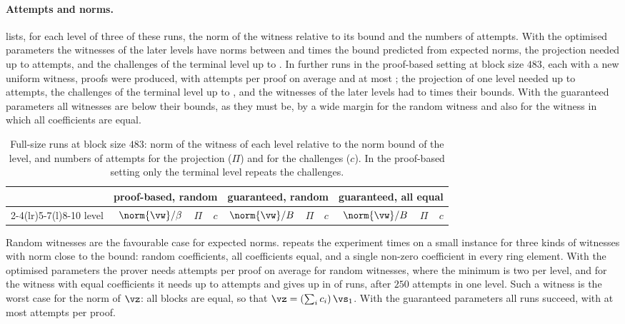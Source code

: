 \paragraph{Attempts and norms.}
 lists, for each level of three of these runs, the norm of the witness relative to its bound and the numbers of attempts. With the optimised parameters the witnesses of the later levels have norms between \nFillLo{} and \nFillHi{} times the bound predicted from expected norms, the projection needed up to \nJlMaxOpt{} attempts, and the challenges of the terminal level up to \nCMaxOpt. In \nRepRuns{} further runs in the proof-based setting at block size $483$, each with a new uniform witness, \nRepOk{} proofs were produced, with \nRepAttMean{} attempts per proof on average and at most \nRepAttMax{}; the projection of one level needed up to \nRepJlMax{} attempts, the challenges of the terminal level up to \nRepCMax{}, and the witnesses of the later levels had \nRepFillLo{} to \nRepFillHi{} times their bounds. With the guaranteed parameters all witnesses are below their bounds, as they must be, by a wide margin for the random witness and also for the witness in which all coefficients are equal.

\begin{table}[t]
\centering\small
\setlength{\tabcolsep}{5pt}
\begin{tabular}{@{}crrrrrrrrr@{}}
\toprule
 & \multicolumn{3}{c}{proof-based, random} & \multicolumn{3}{c}{guaranteed, random} & \multicolumn{3}{c}{guaranteed, all equal}\\
\cmidrule(lr){2-4}\cmidrule(lr){5-7}\cmidrule(l){8-10}
level & $\norm{\vw}/\beta$ & $\Pi$ & $c$ & $\norm{\vw}/B$ & $\Pi$ & $c$ & $\norm{\vw}/B$ & $\Pi$ & $c$\\
\midrule

\bottomrule
\end{tabular}
\caption{Full-size runs at block size $483$: norm of the witness of each level relative to the norm bound of the level, and numbers of attempts for the projection ($\Pi$) and for the challenges ($c$). In the proof-based setting only the terminal level repeats the challenges.}
\label{tab:stats}
\end{table}

Random witnesses are the favourable case for expected norms.  repeats the experiment \nRetRuns{} times on a small instance for three kinds of witnesses with norm close to the bound: random coefficients, all coefficients equal, and a single non-zero coefficient in every ring element. With the optimised parameters the prover needs \nRetOptUni{} attempts per proof on average for random witnesses, where the minimum is two per level, and for the witness with equal coefficients it needs up to \nRetOptConstMax{} attempts and gives up in \nRetOptConstFail{} of \nRetRuns{} runs, after $250$ attempts in one level. Such a witness is the worst case for the norm of $\vz$: all blocks are equal, so that $\vz=(\sum_ic_i)\,\vs_1$. With the guaranteed parameters all runs succeed, with at most \nRetGcMax{} attempts per proof.

